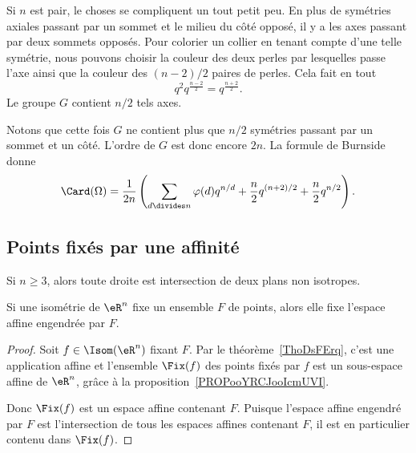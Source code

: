 Si \( n\) est pair, le choses se compliquent un tout petit peu. En plus de symétries axiales passant par un sommet et le milieu du côté opposé, il y a les axes passant par deux sommets opposés. Pour colorier un collier en tenant compte d'une telle symétrie, nous pouvons choisir la couleur des deux perles par lesquelles passe l'axe ainsi que la couleur des \( (n-2)/2\) paires de perles. Cela fait en tout
\begin{equation}
	q^2q^{\frac{ n-2 }{2}}=q^{\frac{ n+2 }{2}}.
\end{equation}
Le groupe \( G\) contient \( n/2\) tels axes.

Notons que cette fois \( G\) ne contient plus que \( n/2\) symétries passant par un sommet et un côté. L'ordre de \( G\) est donc encore \( 2n\). La formule de Burnside donne
\begin{equation}
	\Card(\Omega)=\frac{1}{ 2n }\left( \sum_{d\divides n}\varphi(d)q^{n/d}+\frac{ n }{2}q^{(n+2)/2}+\frac{ n }{2}q^{n/2} \right).
\end{equation}

\subsection{Points fixés par une affinité}

\begin{lemma}        \label{LEMooGUEGooTUXRsQ}
	Si \( n\geq 3\), alors toute droite est intersection de deux plans non isotropes.
\end{lemma}

\begin{proposition}      \label{PROPooVEEUooJQmmkN}
	Si une isométrie de \( \eR^n\) fixe un ensemble \( F\) de points, alors elle fixe l'espace affine engendrée par \( F\).
\end{proposition}

\begin{proof}
	Soit \( f\in \Isom(\eR^n)\) fixant \( F\). Par le théorème~\ref{ThoDsFErq}, c'est une application affine et l'ensemble \( \Fix(f)\) des points fixés par \( f\) est un sous-espace affine de \( \eR^n\), grâce à la proposition~\ref{PROPooYRCJooIcmUVI}.

	Donc \( \Fix(f)\) est un espace affine contenant \( F\). Puisque l'espace affine engendré par \( F\) est l'intersection de tous les espaces affines contenant \( F\), il est en particulier contenu dans \( \Fix(f)\).
\end{proof}

